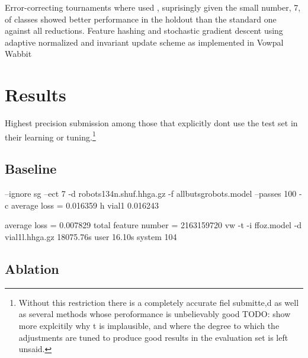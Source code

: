 \documentclass{article}
\begin{document}
Error-correcting tournaments \citep{beygelzimer2009error} where used , suprisingly given the small number, 7, of classes showed better performance in the holdout than the standard one against all reductions. 
Feature hashing and stochastic gradient descent using adaptive normalized and invariant update scheme as implemented in Vowpal Wabbit \cite{mcmahan2010adaptive, duchi2011adaptive, agarwal2014reliable} 



\section{Results}

Highest precision submission among those that explicitly dont use the test set in their learning or tuning.\footnote{ Without this restriction there is a completely accurate fiel submitte,d as well as several methods whose peroformance is unbelievably good TODO: show more explcitily why t is implausible, and where the degree to which the adjustments are tuned to produce good results in the evaluation set is left unsaid.}

\subsection{Baseline}
 
 --ignore sg --ect 7 -d robots134n.shuf.hhga.gz -f allbutsgrobots.model --passes 100 -c
 average loss = 0.016359 h                       
vial1 0.016243

average loss = 0.007829
total feature number = 2163159720
vw -t -i ffoz.model -d vial1l.hhga.gz  18075.76s user 16.10s system 104%



\subsection{Ablation}
%
\end{document}
